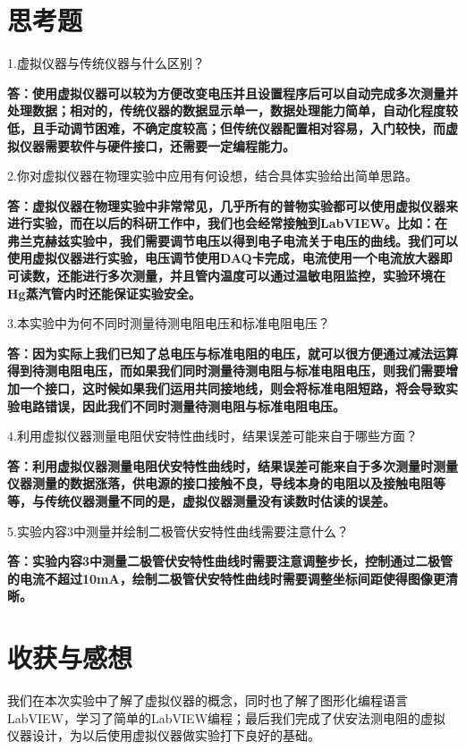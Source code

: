 \documentclass[UTF8]{ctexart}
\begin{document}
	\section{思考题}
	1.虚拟仪器与传统仪器与什么区别？
	\par \textbf{答：使用虚拟仪器可以较为方便改变电压并且设置程序后可以自动完成多次测量并处理数据；相对的，传统仪器的数据显示单一，数据处理能力简单，自动化程度较低，且手动调节困难，不确定度较高；但传统仪器配置相对容易，入门较快，而虚拟仪器需要软件与硬件接口，还需要一定编程能力。}
	\par 2.你对虚拟仪器在物理实验中应用有何设想，结合具体实验给出简单思路。
	\par \textbf{答：虚拟仪器在物理实验中非常常见，几乎所有的普物实验都可以使用虚拟仪器来进行实验，而在以后的科研工作中，我们也会经常接触到LabVIEW。比如：在弗兰克赫兹实验中，我们需要调节电压以得到电子电流关于电压的曲线。我们可以使用虚拟仪器进行实验，电压调节使用DAQ卡完成，电流使用一个电流放大器即可读数，还能进行多次测量，并且管内温度可以通过温敏电阻监控，实验环境在Hg蒸汽管内时还能保证实验安全。}
	\par 3.本实验中为何不同时测量待测电阻电压和标准电阻电压？
	\par \textbf{答：因为实际上我们已知了总电压与标准电阻的电压，就可以很方便通过减法运算得到待测电阻电压，而如果我们同时测量待测电阻与标准电阻电压，则我们需要增加一个接口，这时候如果我们运用共同接地线，则会将标准电阻短路，将会导致实验电路错误，因此我们不同时测量待测电阻与标准电阻电压。}
	\par 4.利用虚拟仪器测量电阻伏安特性曲线时，结果误差可能来自于哪些方面？
	\par \textbf{答：利用虚拟仪器测量电阻伏安特性曲线时，结果误差可能来自于多次测量时测量仪器测量的数据涨落，供电源的接口接触不良，导线本身的电阻以及接触电阻等等，与传统仪器测量不同的是，虚拟仪器测量没有读数时估读的误差。}
	\par 5.实验内容3中测量并绘制二极管伏安特性曲线需要注意什么？
	\par \textbf{答：实验内容3中测量二极管伏安特性曲线时需要注意调整步长，控制通过二极管的电流不超过10mA，绘制二极管伏安特性曲线时需要调整坐标间距使得图像更清晰。}
	\section{收获与感想}
	我们在本次实验中了解了虚拟仪器的概念，同时也了解了图形化编程语言LabVIEW，学习了简单的LabVIEW编程；最后我们完成了伏安法测电阻的虚拟仪器设计，为以后使用虚拟仪器做实验打下良好的基础。
\end{document}
